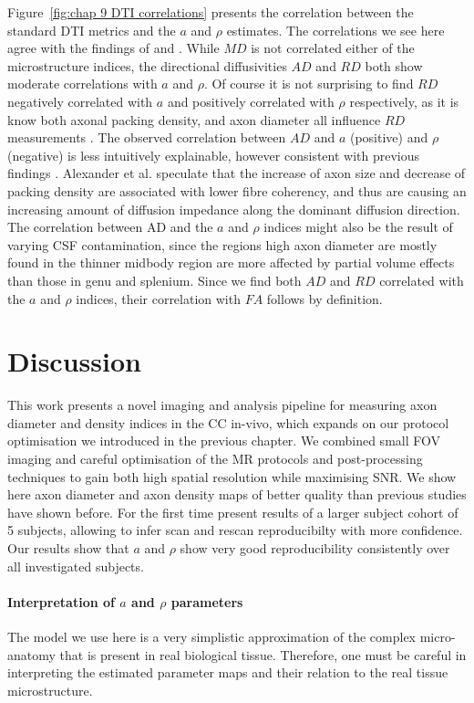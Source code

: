 Figure~\ref{fig:chap 9 DTI correlations} presents the correlation between the standard DTI metrics and the $a$ and $\rho$ estimates. The correlations we see here agree with the findings of \citep{Barazany:2009} and \citep{Alexander:2010}. While $MD$ is not correlated either of the microstructure indices, the directional diffusivities $AD$ and $RD$ both show moderate correlations with $a$ and $\rho$. Of course it is not surprising to find $RD$ negatively correlated with $a$ and positively correlated with $\rho$ respectively, as it is know both axonal packing density, and axon diameter all influence $RD$ measurements \citep{Beaulieu:2002}. The observed correlation between $AD$ and $a$ (positive) and $\rho$ (negative) is less intuitively explainable, however consistent with previous findings \citep{Barazany:2009,Alexander:2010}. Alexander et al. speculate that the increase of axon size and decrease of packing density are associated with lower fibre coherency, and thus are causing an increasing amount of diffusion impedance along the dominant diffusion direction. The correlation between AD and the $a$ and $\rho$ indices might also be the result of varying CSF contamination, since the regions high axon diameter are mostly found in the thinner midbody region are more affected by partial volume effects than those in genu and splenium. Since we find both $AD$ and $RD$ correlated with the $a$ and $\rho$ indices, their correlation with $FA$ follows by definition.  
\egroup %
\FloatBarrier
\section{Discussion}
This work presents a novel imaging and analysis pipeline for measuring axon diameter and density indices in the CC in-vivo, which expands on our \SFasym{} protocol optimisation we introduced in the previous chapter. We combined small FOV imaging and careful optimisation of the MR protocols and post-processing techniques to gain both high spatial resolution while maximising SNR. We show here axon diameter and axon density maps of better quality than previous studies have shown before. For the first time present results of a larger subject cohort of 5 subjects, allowing to infer scan and rescan reproducibilty with more confidence. Our results show that $a$ and $\rho$ show very good reproducibility consistently over all investigated subjects. 

\paragraph{Interpretation of $a$ and $\rho$ parameters}The model we use here is a very simplistic approximation of the complex micro-anatomy that is present in real biological tissue. Therefore, one must be careful in interpreting the estimated parameter maps and their relation to the real tissue microstructure. 


